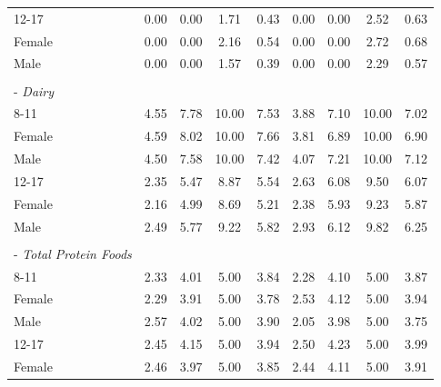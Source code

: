 \documentclass[12pt,leqno,titlepage]{amsart}
\newcommand{\1}{\mathbbm{1}}
\begin{document}
\begin{bibunit}
\begin{longtable}{@{\extracolsep{\fill}}lcccc|cccc@{}}
\hspace*{2.2em}12-17 & 0.00 & 0.00 & 1.71 & 0.43 & 0.00 & 0.00 & 2.52 & 0.63 \\
\hspace*{4.4em}Female & 0.00 & 0.00 & 2.16 & 0.54 & 0.00 & 0.00 & 2.72 & 0.68 \\
\hspace*{4.4em}Male & 0.00 & 0.00 & 1.57 & 0.39 & 0.00 & 0.00 & 2.29 & 0.57 \\
\rule{0pt}{1.1em} & & & & & & & & \\
\hspace*{0.8em}- \textit{Dairy} & & & & & & & & \\
\hspace*{2.2em}8-11 & 4.55 & 7.78 & 10.00 & 7.53 & 3.88 & 7.10 & 10.00 & 7.02 \\
\hspace*{4.4em}Female & 4.59 & 8.02 & 10.00 & 7.66 & 3.81 & 6.89 & 10.00 & 6.90 \\
\hspace*{4.4em}Male & 4.50 & 7.58 & 10.00 & 7.42 & 4.07 & 7.21 & 10.00 & 7.12 \\
\hspace*{2.2em}12-17 & 2.35 & 5.47 & 8.87 & 5.54 & 2.63 & 6.08 & 9.50 & 6.07 \\
\hspace*{4.4em}Female & 2.16 & 4.99 & 8.69 & 5.21 & 2.38 & 5.93 & 9.23 & 5.87 \\
\hspace*{4.4em}Male & 2.49 & 5.77 & 9.22 & 5.82 & 2.93 & 6.12 & 9.82 & 6.25 \\
\rule{0pt}{1.1em} & & & & & & & & \\
\hspace*{0.8em}- \textit{Total Protein Foods} & & & & & & & & \\
\hspace*{2.2em}8-11 & 2.33 & 4.01 & 5.00 & 3.84 & 2.28 & 4.10 & 5.00 & 3.87 \\
\hspace*{4.4em}Female & 2.29 & 3.91 & 5.00 & 3.78 & 2.53 & 4.12 & 5.00 & 3.94 \\
\hspace*{4.4em}Male & 2.57 & 4.02 & 5.00 & 3.90 & 2.05 & 3.98 & 5.00 & 3.75 \\
\hspace*{2.2em}12-17 & 2.45 & 4.15 & 5.00 & 3.94 & 2.50 & 4.23 & 5.00 & 3.99 \\
\hspace*{4.4em}Female & 2.46 & 3.97 & 5.00 & 3.85 & 2.44 & 4.11 & 5.00 & 3.91 \\

\end{longtable}
\end{bibunit}
\end{document}
